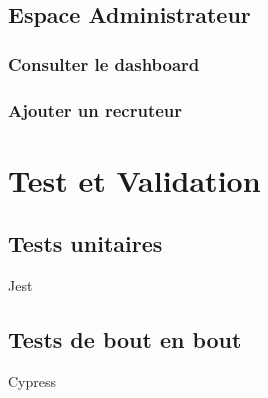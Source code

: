 \subsection{Espace Administrateur}

\subsubsection{Consulter le dashboard}

\subsubsection{Ajouter un recruteur}

\section{Test et Validation}
\subsection{Tests unitaires}
Jest

\subsection{Tests de bout en bout}
Cypress

